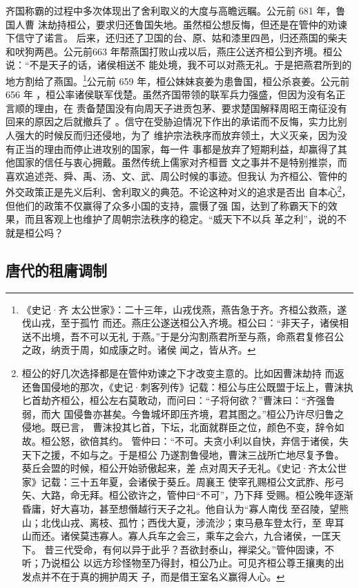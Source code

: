 齐国称霸的过程中多次体现出了舍利取义的大度与高瞻远瞩。公元前 681 年，鲁国人曹
沫劫持桓公，要求归还鲁国失地。虽然桓公想反悔，但还是在管仲的劝谏下信守了诺言。
后来，还归还了卫国的台、原、姑和漆里四邑，归还燕国的柴夫和吠狗两邑。公元前663
年帮燕国打败山戎以后，燕庄公送齐桓公到齐境。桓公说：“不是天子的话，诸侯相送不
能处境，我不可以对燕无礼。于是把燕君所到的地方割给了燕国。\footnote{《史记·齐
    太公世家》：二十三年，山戎伐燕，燕告急于齐。齐桓公救燕，遂伐山戎，至于孤竹
    而还。燕庄公遂送桓公入齐境。桓公曰：“非天子，诸侯相送不出境，吾不可以无礼
于燕。”于是分沟割燕君所至与燕，命燕君复修召公之政，纳贡于周，如成康之时。诸侯
闻之，皆从齐。}公元前 659 年，桓公妹妹哀姜为患鲁国，桓公杀哀姜。公元前 656 年
，桓公率诸侯联军伐楚。虽然齐国带领的联军兵力强盛，但因为没有名正言顺的理由，在
责备楚国没有向周天子进贡包茅、要求楚国解释周昭王南征没有回来的原因之后就撤兵了
。信守在受胁迫情况下作出的承诺而不反悔，实力比别人强大的时候反而归还侵地，为了
维护宗法秩序而放弃领土，大义灭亲，因为没有正当的理由而停止进攻别的国家，每一件
事都是放弃了短期利益，却赢得了其他国家的信任与衷心拥戴。虽然传统上儒家对齐桓晋
文之事并不是特别推崇，而喜欢追述尧、舜、禹、汤、文、武、周公时候的事迹。但我认
为齐桓公、管仲的外交政策正是先义后利、舍利取义的典范。不论这种对义的追求是否出
自本心\footnote{桓公的好几次选择都是在管仲劝谏之下才改变主意的。比如因曹沫劫持
    而返还鲁国侵地的那次，《史记·刺客列传》记载：桓公与庄公既盟于坛上，曹沫执
    匕首劫齐桓公，桓公左右莫敢动，而问曰：“子将何欲？”曹沫曰：“齐强鲁弱，而大
    国侵鲁亦甚矣。今鲁城坏即压齐境，君其图之。”桓公乃许尽归鲁之侵地。既已言，
    曹沫投其匕首，下坛，北面就群臣之位，颜色不变，辞令如故。桓公怒，欲倍其约。
    管仲曰：“不可。夫贪小利以自快，弃信于诸侯，失天下之援，不如与之。于是桓公
    乃遂割鲁侵地，曹沫三战所亡地尽复予鲁。葵丘会盟的时候，桓公开始骄傲起来，差
    点对周天子无礼。《史记·齐太公世家》记载：三十五年夏，会诸侯于葵丘。周襄王
    使宰孔赐桓公文武胙、彤弓矢、大路，命无拜。桓公欲许之，管仲曰“不可”，乃下拜
    受赐。桓公晚年逐渐昏庸，好大喜功，甚至想僭越行天子之礼。他自认为“寡人南伐
    至召陵，望熊山；北伐山戎、离枝、孤竹；西伐大夏，涉流沙；束马悬车登太行，至
    卑耳山而还。诸侯莫违寡人。寡人兵车之会三，乘车之会六，九合诸侯，一匡天下。
    昔三代受命，有何以异于此乎？吾欲封泰山，禅梁父。”管仲固谏，不听；乃说桓公
以远方珍怪物至乃得封，桓公乃止。可见齐桓公尊王攘夷的出发点并不在于真的拥护周天
子，而是借王室名义赢得人心。}，但他们的政策不仅赢得了众多小国的支持，震慑了强
国，达到了称霸天下的效果，而且客观上也维护了周朝宗法秩序的稳定。“威天下不以兵
革之利”，说的不就是桓公吗？

\subsection{唐代的租庸调制}

